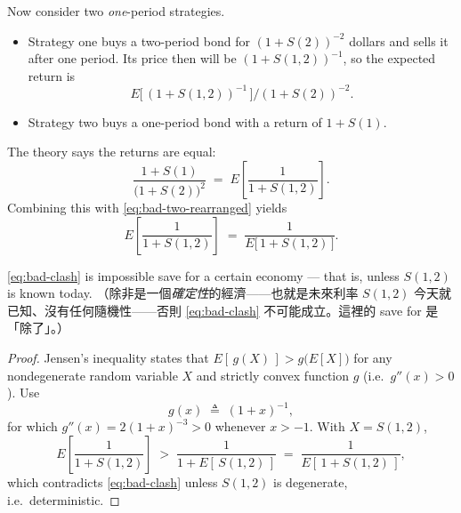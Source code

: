 
Now consider two \emph{one}-period strategies.

\begin{itemize}[nosep]
	\item Strategy one buys a two-period bond for $(1+S(2))^{-2}$ dollars and sells it after one period.
	      Its price then will be $(1+S(1,2))^{-1}$, so the expected return is
	      \[
		      E\bigl[\,(1+S(1,2))^{-1}\,\bigr]\big/(1+S(2))^{-2} .
	      \]
	\item Strategy two buys a one-period bond with a return of $1+S(1)$.
\end{itemize}


The theory says the returns are equal:
\[
	\frac{1+S(1)}{\bigl(1+S(2)\bigr)^{2}} \;=\; E\left[\frac{1}{1+S(1,2)}\right] .
\]
Combining this with \eqref{eq:bad-two-rearranged} yields
\begin{equation}
	E\left[\frac{1}{1+S(1,2)}\right] \;=\; \frac{1}{E\bigl[\,1+S(1,2)\,\bigr]} . \label{eq:bad-clash}
\end{equation}


\begin{proposition}
	\eqref{eq:bad-clash} is impossible save for a certain economy --- that is, unless $S(1,2)$ is known today.
	（除非是一個\emph{確定性}的經濟——也就是未來利率 $S(1,2)$ 今天就已知、沒有任何隨機性——否則 \eqref{eq:bad-clash} 不可能成立。這裡的 save for 是「除了」。）
\end{proposition}

\begin{proof}
	Jensen's inequality states that $E[\,g(X)\,]>g\bigl(E[X]\bigr)$ for any nondegenerate random variable $X$ and strictly convex function $g$ (i.e.\ $g''(x)>0$).
	Use
	\[
		g(x) \;\triangleq\; (1+x)^{-1} ,
	\]
	for which $g''(x)=2(1+x)^{-3}>0$ whenever $x>-1$.
	With $X=S(1,2)$,
	\[
		E\left[\frac{1}{1+S(1,2)}\right] \;>\; \frac{1}{1+E[\,S(1,2)\,]} \;=\; \frac{1}{E[\,1+S(1,2)\,]} ,
	\]
	which contradicts \eqref{eq:bad-clash} unless $S(1,2)$ is degenerate, i.e.\ deterministic.
\end{proof}

